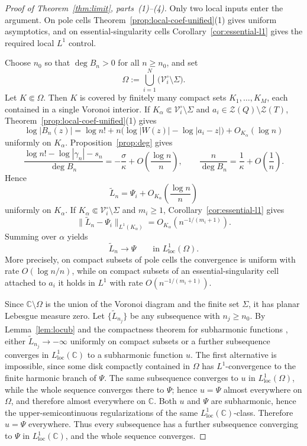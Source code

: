 \documentclass[reqno]{article}
\theoremstyle{definition}
\theoremstyle{remark}
\theoremstyle{plain}
\newcommand{\C}{\mathbb C}
\newcommand{\Z}{\mathcal Z}
\begin{document}
\begin{proof}[Proof of Theorem~\ref{thm:limit}, parts~\textup{(1)}--\textup{(4)}]
Only two local inputs enter the argument. On pole cells Theorem~\ref{prop:local-coef-unified}\textup{(1)} gives uniform asymptotics, and on essential-singularity cells Corollary~\ref{cor:essential-l1} gives the required local $L^1$ control.

Choose $n_0$ so that $\deg B_n>0$ for all $n\ge n_0$, and set
$$\Omega:=\bigcup_{i=1}^N\bigl(\mathcal V_i^\circ\setminus\Sigma\bigr).$$
Let $K\Subset\Omega$. Then $K$ is covered by finitely many compact sets $K_1,\dots,K_M$, each contained in a single Voronoi interior. If $K_\alpha\Subset\mathcal V_i^\circ\setminus\Sigma$ and $a_i\in \Z(Q)\setminus \Z(T)$, Theorem~\ref{prop:local-coef-unified}\textup{(1)} gives
\[
\log|B_n(z)|
=\log n!+n\bigl(\log|W(z)|-\log|a_i-z|\bigr)+O_{K_\alpha}(\log n)
\]
uniformly on $K_\alpha$. Proposition~\ref{prop:deg} gives
\[
\frac{\log n!-\log|\gamma_n|-s_n}{\deg B_n}
=-\frac{\sigma}{\kappa}+O\!\left(\frac{\log n}{n}\right),
\qquad
\frac{n}{\deg B_n}=\frac1\kappa+O\!\left(\frac1n\right).
\]
Hence
$$\widetilde L_n=\Psi_i+O_{K_\alpha}\!\left(\frac{\log n}{n}\right)$$
uniformly on $K_\alpha$. If $K_\alpha\Subset\mathcal V_i^\circ\setminus\Sigma$ and $m_i\ge1$, Corollary~\ref{cor:essential-l1} gives
$$\|\widetilde L_n-\Psi_i\|_{L^1(K_\alpha)}=O_{K_\alpha}\!\left(n^{-1/(m_i+1)}\right).$$
Summing over $\alpha$ yields
$$\widetilde L_n\to\Psi\qquad\text{in }L^1_{\mathrm{loc}}(\Omega).$$
More precisely, on compact subsets of pole cells the convergence is uniform with rate $O(\log n/n)$, while on compact subsets of an essential-singularity cell attached to $a_i$ it holds in $L^1$ with rate $O\!\left(n^{-1/(m_i+1)}\right)$.

Since $\C\setminus\Omega$ is the union of the Voronoi diagram and the finite set $\Sigma$, it has planar Lebesgue measure zero. Let $\{\widetilde L_{n_j}\}$ be any subsequence with $n_j\ge n_0$. By Lemma~\ref{lem:locub} and the compactness theorem for subharmonic functions \cite{Ra}, either $\widetilde L_{n_j}\to-\infty$ uniformly on compact subsets or a further subsequence converges in $L^1_{\mathrm{loc}}(\C)$ to a subharmonic function $u$. The first alternative is impossible, since some disk compactly contained in $\Omega$ has $L^1$-convergence to the finite harmonic branch of $\Psi$. The same subsequence converges to $u$ in $L^1_{\mathrm{loc}}(\Omega)$, while the whole sequence converges there to $\Psi$; hence $u=\Psi$ almost everywhere on $\Omega$, and therefore almost everywhere on $\C$. Both $u$ and $\Psi$ are subharmonic, hence the upper-semicontinuous regularizations of the same $L^1_{\mathrm{loc}}(\C)$-class. Therefore $u=\Psi$ everywhere. Thus every subsequence has a further subsequence converging to $\Psi$ in $L^1_{\mathrm{loc}}(\C)$, and the whole sequence converges.


\end{proof}
\end{document}
